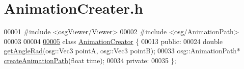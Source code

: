 \hypertarget{_animation_creater_8h_source}{\section{Animation\+Creater.\+h}
\label{_animation_creater_8h_source}
}

\begin{DoxyCode}
00001 \textcolor{preprocessor}{#include <osgViewer/Viewer>}
00002 \textcolor{preprocessor}{#include <osg/AnimationPath>}
00003 
00004 
\hypertarget{_animation_creater_8h_source_l00005}{}\hyperlink{class_animation_creator}{00005}     \textcolor{keyword}{class }\hyperlink{class_animation_creator}{AnimationCreator} \{
00013     \textcolor{keyword}{public}:
00024         \textcolor{keywordtype}{double} \hyperlink{class_animation_creator_a03e8400c38e8710ee20fd44f57ab1903}{getAngleRad}(osg::Vec3 pointA, osg::Vec3 pointB);
00033         osg::AnimationPath* \hyperlink{class_animation_creator_aca52f3472d0be7043c63ff5ede8084aa}{createAnimationPath}(\textcolor{keywordtype}{float} time);
00034     \textcolor{keyword}{private}:
00035     \};
\end{DoxyCode}
